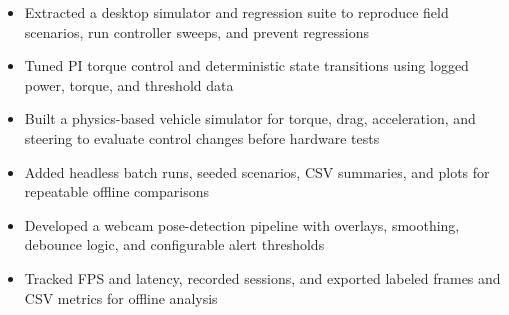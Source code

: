 \documentclass[10pt,letterpaper]{article}
\begin{document}
\entryspace

\orgline{\spartanracing}
\begin{itemize}
  \item Extracted a desktop simulator and regression suite to reproduce field scenarios, run controller sweeps, and prevent regressions
  \item Tuned PI torque control and deterministic state transitions using logged power, torque, and threshold data
\end{itemize}


\orgline{\spartanracing}
\begin{itemize}
  \item Built a physics-based vehicle simulator for torque, drag, acceleration, and steering to evaluate control changes before hardware tests
  \item Added headless batch runs, seeded scenarios, CSV summaries, and plots for repeatable offline comparisons
\end{itemize}

\entryspace

\begin{itemize}
  \item Developed a webcam pose-detection pipeline with overlays, smoothing, debounce logic, and configurable alert thresholds
  \item Tracked FPS and latency, recorded sessions, and exported labeled frames and CSV metrics for offline analysis
\end{itemize}
\end{document}

